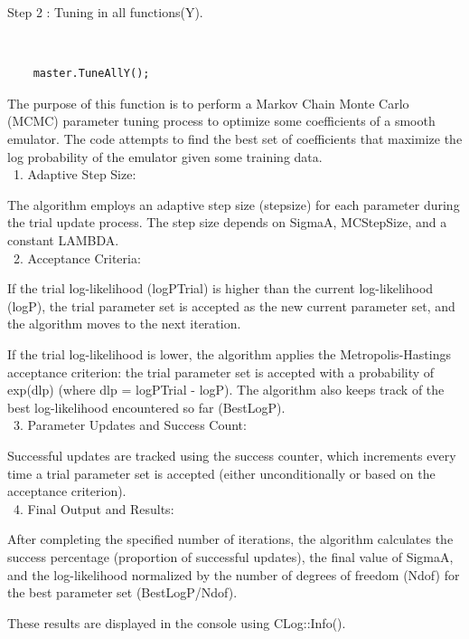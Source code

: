 \documentclass[12pt]{article}
\numberwithin{equation}{section}
\numberwithin{figure}{section}
\begin{document}
\begin{description}
\item[Step 2 : Tuning in all functions(Y). ]
\end{description}

{\tt 
\begin{verbatim}
    master.TuneAllY(); 
\end{verbatim}
}

The purpose of this function is to perform a Markov Chain Monte Carlo (MCMC) parameter tuning process to optimize some coefficients of a smooth emulator. The code attempts to find the best set of coefficients that maximize the log probability of the emulator given some training data. \\

\ 1. Adaptive Step Size:

The algorithm employs an adaptive step size (stepsize) for each parameter during the trial update process. The step size depends on SigmaA, MCStepSize, and a constant LAMBDA. \\

\ 2. Acceptance Criteria:

If the trial log-likelihood (logPTrial) is higher than the current log-likelihood (logP), the trial parameter set is accepted as the new current parameter set, and the algorithm moves to the next iteration.

If the trial log-likelihood is lower, the algorithm applies the Metropolis-Hastings acceptance criterion: the trial parameter set is accepted with a probability of exp(dlp) (where dlp = logPTrial - logP). The algorithm also keeps track of the best log-likelihood encountered so far (BestLogP). \\

\ 3. Parameter Updates and Success Count:

Successful updates are tracked using the success counter, which increments every time a trial parameter set is accepted (either unconditionally or based on the acceptance criterion). \\ 

\ 4. Final Output and Results:

After completing the specified number of iterations, the algorithm calculates the success percentage (proportion of successful updates), the final value of SigmaA, and the log-likelihood normalized by the number of degrees of freedom (Ndof) for the best parameter set (BestLogP/Ndof).

These results are displayed in the console using CLog::Info(). \\ 
\end{document}
